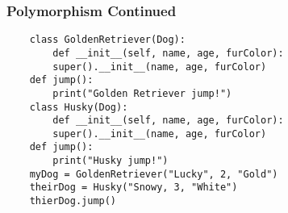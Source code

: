 \documentclass{beamer}
\begin{document}
\begin{frame}[fragile]
\frametitle{Polymorphism Continued}
\begin{lstlisting}
    class GoldenRetriever(Dog):
        def __init__(self, name, age, furColor):
        super().__init__(name, age, furColor)
    def jump():
        print("Golden Retriever jump!")
    class Husky(Dog):
        def __init__(self, name, age, furColor):
        super().__init__(name, age, furColor)
    def jump():
        print("Husky jump!")
    myDog = GoldenRetriever("Lucky", 2, "Gold")
    theirDog = Husky("Snowy, 3, "White")  
    thierDog.jump()
\end{lstlisting}
\end{frame}
\end{document}
